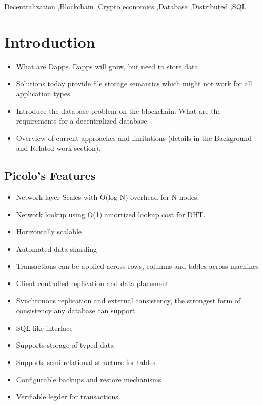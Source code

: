\documentclass[preprint,12pt]{elsarticle}
\begin{document}
\begin{frontmatter}
\begin{keyword}
Decentralization \sep Blockchain \sep Crypto economics \sep Database \sep Distributed \sep SQL


\end{keyword}

\end{frontmatter}
\section{Introduction}\label{Sect:Introduction}


    \begin{itemize}
        \item What are Dapps. Dapps will grow, but need to store data.
        \item Solutions today provide file storage semantics which might not work for all application types.
        \item Introduce the database problem on the blockchain. What are the requirements for a decentralized database.
        \item Overview of current approaches and limitations (details in the Background and Related work section).
    \end{itemize}


\subsection{Picolo's Features}
\begin{itemize}
    \item Network layer Scales with O(log N) overhead for N nodes.
    \item Network lookup using O(1) amortized lookup cost for DHT.
    \item Horizontally scalable 
    \item Automated data sharding
    \item Transactions can be applied across rows, columns and tables across machines
    \item Client controlled replication and data placement
    \item Synchronous replication and external consistency, the strongest form of consistency any database can support
    \item SQL like interface
    \item Supports storage of typed data
    \item Supports semi-relational structure for tables
    \item Configurable backups and restore mechanisms
    \item Verifiable legder for transactions.
\end{itemize}
\end{document}
